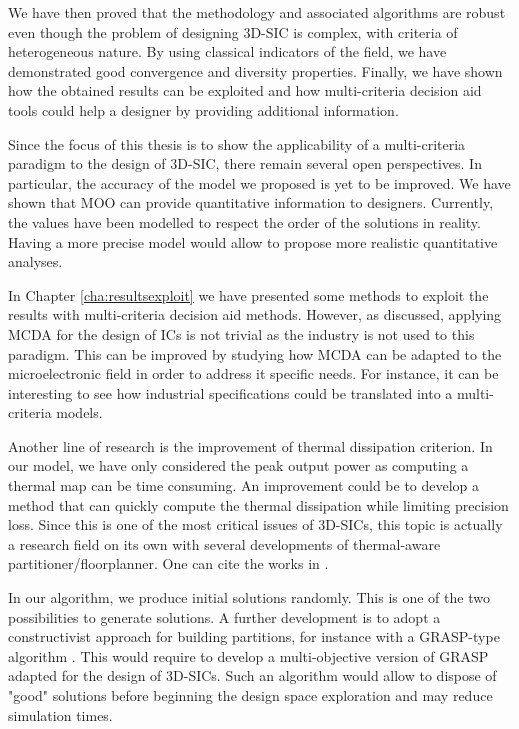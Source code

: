 We have then proved that the methodology and associated algorithms are robust even though the problem of designing 3D-SIC is complex, with criteria of heterogeneous nature. By using classical indicators of the field, we have demonstrated good convergence and diversity properties. Finally, we have shown how the obtained results can be exploited and how multi-criteria decision aid tools could help a designer by providing additional information.

Since the focus of this thesis is to show the applicability of a multi-criteria paradigm to the design of 3D-SIC, there remain several open perspectives. In particular, the accuracy of the model we proposed is yet to be improved. We have shown that MOO can provide quantitative information to designers. Currently, the values have been modelled to respect the order of the solutions in reality. Having a more precise model would allow to propose more realistic quantitative analyses.

In Chapter \ref{cha:resultsexploit} we have presented some methods to exploit the results with multi-criteria decision aid methods. However, as discussed, applying MCDA for the design of ICs is not trivial as the industry is not used to this paradigm. This can be improved by studying how MCDA can be adapted to the microelectronic field in order to address it specific needs. For instance, it can be interesting to see how industrial specifications could be translated into a multi-criteria models.

Another line of research is the improvement of thermal dissipation criterion. In our model, we have only considered the peak output power as computing a thermal map can be time consuming. An improvement could be to develop a method that can quickly compute the thermal dissipation while limiting precision loss. Since this is one of the most critical issues of 3D-SICs, this topic is actually a research field on its own with several developments of thermal-aware partitioner/floorplanner. One can cite the works in \cite{1594713,1112292,1486402}.

In our algorithm, we produce initial solutions randomly. This is one of the two possibilities to generate solutions. A further development is to adopt a constructivist approach for building partitions, for instance with a GRASP-type algorithm \cite{HarSho87a,DBLP:dblp_conf/sccc/ViannaAVA05}. This would require to develop a multi-objective version of GRASP adapted for the design of 3D-SICs. Such an algorithm would allow to dispose of "good" solutions before beginning the design space exploration and may reduce simulation times.

